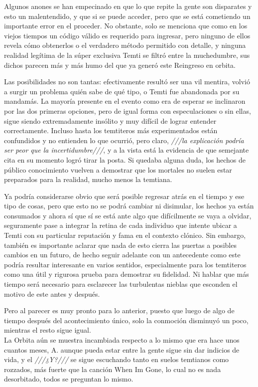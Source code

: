 \documentclass[
  spanish,
]{book}
\begin{document}
Algunos anones se han empecinado en que lo que repite la gente son disparates y esto un malentendido, y que si se puede acceder, pero que se está cometiendo un importante error en el proceder. No obstante, solo se menciona que como en los viejos tiempos un código válido es requerido para ingresar, pero ninguno de ellos revela cómo obtenerlos o el verdadero método permitido con detalle, y ninguna realidad legítima de la súper exclusiva Temti se filtró entre la muchedumbre, sus dichos parecen más y más humo del que ya generó este Reingreso en orbita.

Las posibilidades no son tantas: efectivamente resultó ser una vil mentira, volvió a surgir un problema quién sabe de qué tipo, o Temti fue abandonada por su mandamás. La mayoría presente en el evento como era de esperar se inclinaron por las dos primeras opciones, pero de igual forma con especulaciones o sin ellas, sigue siendo extremadamente insólito y muy difícil de lograr entender correctamente. Incluso hasta los temtiteros más experimentados están confundidos y no entienden lo que ocurrió, pero claro, \emph{///la explicación podría ser peor que la incertidumbre///}, y a la vista está la evidencia de que semejante cita en su momento logró tirar la posta. Si quedaba alguna duda, los hechos de público conocimiento vuelven a demostrar que los mortales no suelen estar preparados para la realidad, mucho menos la temtiana.

Ya podría considerarse obvio que será posible regresar atrás en el tiempo y ese tipo de cosas, pero que esto no se podrá cambiar ni disimular, los hechos ya están consumados y ahora sí que sí se está ante algo que difícilmente se vaya a olvidar, seguramente pase a integrar la retina de cada individuo que intente ubicar a Temti con su particular reputación y fama en el contexto clónico. Sin embargo, también es importante aclarar que nada de esto cierra las puertas a posibles cambios en un futuro, de hecho seguir adelante con un antecedente como este podría resultar interesante en varios sentidos, especialmente para los temtiteros como una útil y rigurosa prueba para demostrar su fidelidad. Ni hablar que más tiempo será necesario para esclarecer las turbulentas nieblas que esconden el motivo de este antes y después.

Pero al parecer es muy pronto para lo anterior, puesto que luego de algo de tiempo después del acontecimiento único, solo la conmoción disminuyó un poco, mientras el resto sigue igual.\\
La Orbita aún se muestra incambiada respecto a lo mismo que era hace unos cuantos meses, A. aunque pueda estar entre la gente sigue sin dar indicios de vida, y el \emph{///¿Y?///} se sigue escuchando tanto en suelos temtianos como rozzados, más fuerte que la canción When Im Gone, lo cual no es nada desorbitado, todos se preguntan lo mismo.
\end{document}
